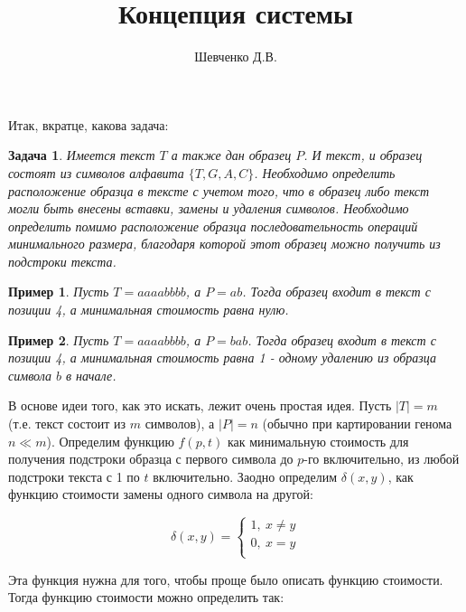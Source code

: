 \documentclass[11pt,a4paper,oneside]{article}
\begin{document}
\newtheorem{example}{Пример}
\newtheorem{task}{Задача}
\newtheorem{heuristic}{Задача}
\title{Концепция системы}
\author{Шевченко Д.В.}

\maketitle

Итак, вкратце, какова задача:

\begin{task}
Имеется текст $T$ а также дан образец $P$. И текст, и образец состоят из символов алфавита $\{T,G,A,C\}$. Необходимо определить расположение образца в тексте с учетом того, что в образец либо текст могли быть внесены вставки, замены и удаления символов. Необходимо определить помимо расположение образца последовательность операций минимального размера, благодаря которой этот образец можно получить из подстроки текста.
\end{task}

\begin{example}
	Пусть $T=aaaabbbb$, а $P=ab$. Тогда образец входит в текст с позиции 4, а минимальная стоимость равна нулю.
\end{example}

\begin{example}
	Пусть $T=aaaabbbb$, а $P=bab$. Тогда образец входит в текст с позиции 4, а минимальная стоимость равна 1 - одному удалению из образца символа $b$ в начале.
\end{example}

В основе идеи того, как это искать, лежит очень простая идея. Пусть $|T|=m$ (т.е. текст состоит из $m$ символов), а $|P|=n$ (обычно при картировании генома $n\ll m$). Определим функцию $f(p,t)$ как минимальную стоимость для получения подстроки образца с первого символа до $p$-го включительно, из любой подстроки текста с 1 по $t$ включительно. Заодно определим $\delta(x,y)$, как функцию стоимости замены одного символа на другой:

\begin{equation}
	\delta(x,y) = \begin{cases}
	1,\ x\neq y\\
	0,\ x = y\\
	\end{cases}
\end{equation}

Эта функция нужна для того, чтобы проще было описать функцию стоимости. Тогда функцию стоимости можно определить так:
\end{document}
